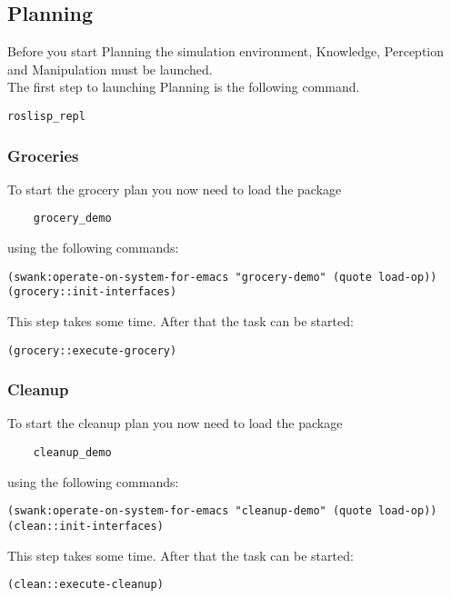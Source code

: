 \documentclass[main.tex]{subfiles}
\begin{document}
	\subsection{Planning}
	Before you start Planning the simulation environment, Knowledge, Perception and Manipulation must be launched.\\
	The first step to launching Planning is the following command.\\
	\begin{lstlisting}
roslisp_repl
\end{lstlisting}

	\subsubsection{Groceries}
	To start the grocery plan you now need to load the package\\ \begin{verbatim}
	grocery_demo
	\end{verbatim}
	 using the following commands:
	\begin{lstlisting}
(swank:operate-on-system-for-emacs "grocery-demo" (quote load-op))
(grocery::init-interfaces)
\end{lstlisting}
This step takes some time. After that the task can be started:\\
\begin{lstlisting}
(grocery::execute-grocery)
\end{lstlisting}

	\subsubsection{Cleanup}
	To start the cleanup plan you now need to load the package\\ \begin{verbatim}
	cleanup_demo
	\end{verbatim}
	 using the following commands:\\
	\begin{lstlisting}
(swank:operate-on-system-for-emacs "cleanup-demo" (quote load-op))
(clean::init-interfaces)
\end{lstlisting}
This step takes some time. After that the task can be started:\\
\begin{lstlisting}
(clean::execute-cleanup)
\end{lstlisting}
\end{document}
